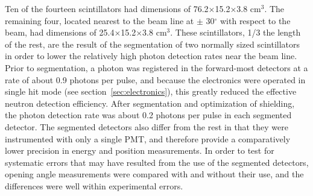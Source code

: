 Ten of the fourteen scintillators had dimensions of 76.2$\times$15.2$\times$3.8 cm$^3$.
The remaining four, located nearest to the beam line at $\pm$ 30$^{\circ}$ with respect to the beam, had dimensions of 25.4$\times$15.2$\times$3.8 cm$^3$.
These scintillators, 1/3 the length of the rest, are the result of the segmentation of two normally sized scintillators in order to lower the relatively high photon detection rates near the beam line.
Prior to segmentation, a photon was registered in the forward-most detectors at a rate of about 0.9 photons per pulse, and because the electronics were operated in single hit mode (see section~\ref{sec:electronics}), this greatly reduced the effective neutron detection efficiency.
After segmentation and optimization of shielding, the photon detection rate was about 0.2 photons per pulse in each segmented detector.\onlyThesis
The segmented detectors also differ from the rest in that they were instrumented with only a single PMT, and therefore provide a comparatively lower precision in energy and position measurements.
In order to test for systematic errors that may have resulted from the use of the segmented detectors, opening angle measurements were compared with and without their use, and the differences were well within experimental errors.

